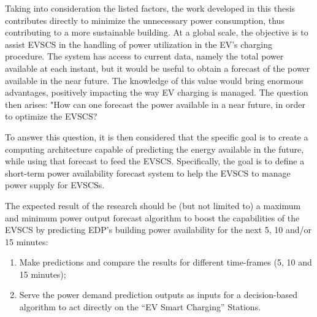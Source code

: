 


 
Taking into consideration the listed factors, the work developed in this thesis contributes directly to minimize the unnecessary power consumption, thus contributing to a more sustainable building. At a global scale, the objective is to assist \ac{EVSCS} in the handling of power utilization in the  \ac{EV}'s charging procedure. The system has access to current data, namely the total power available at each instant, but it would be useful to obtain a forecast of the power available in the near future. The knowledge of this value would bring enormous advantages, positively impacting the way \ac{EV} charging is managed. The question then arises: "How can one forecast the power available in a near future, in order to optimize the \ac{EVSCS}?


To answer this question, it is then considered that the specific goal is to create a computing architecture capable of predicting the energy available in the future, while using that forecast to feed the \ac{EVSCS}. Specifically, the goal is to define a short-term power availability forecast system to help the \ac{EVSCS} to manage power supply for \ac{EVSCSs}.

The expected result of the research should be (but not limited to) a maximum and minimum power output forecast algorithm to boost the capabilities of the \ac{EVSCS} by predicting \ac{EDP}'s building power availability for the next 5, 10 and/or 15 minutes:
\begin{enumerate}[noitemsep,topsep=0pt]
  \itemsep0em 
  \item Make predictions and compare the results for different time-frames (5, 10 and 15 minutes);
  \item Serve the power demand prediction outputs as inputs for a decision-based algorithm to act directly on the “\ac{EV} Smart Charging” Stations.
\end{enumerate}   



